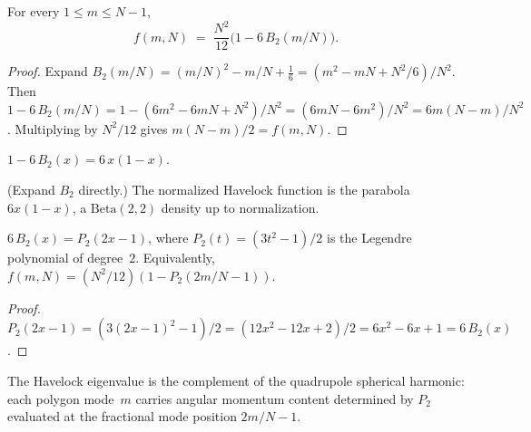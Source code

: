 \begin{theorem}
\label{thm:bernoulli-havelock}
For every $1 \le m \le N{-}1$,
\begin{equation}
  f(m,N) \;=\; \frac{N^2}{12}\bigl(1 - 6\,B_2(m/N)\bigr).
\end{equation}
\end{theorem}
\begin{proof}
Expand
$B_2(m/N) = (m/N)^2 - m/N + \tfrac{1}{6}
= (m^2 - mN + N^2/6)/N^2$.
Then
$1 - 6\,B_2(m/N) = 1 - (6m^2 - 6mN + N^2)/N^2
= (6mN - 6m^2)/N^2 = 6m(N{-}m)/N^2$.
Multiplying by $N^2/12$ gives $m(N{-}m)/2 = f(m,N)$.
\end{proof}

\begin{corollary}
\label{cor:parabola}
$1 - 6\,B_2(x) = 6\,x(1{-}x)$.
\end{corollary}
\noindent
(Expand $B_2$ directly.)
The normalized Havelock function is the parabola $6x(1{-}x)$,
a $\mathrm{Beta}(2,2)$ density up to normalization.

\begin{theorem}
\label{thm:legendre-quadrupole}
$6\,B_2(x) = P_2(2x{-}1)$, where $P_2(t) = (3t^2{-}1)/2$
is the Legendre polynomial of degree~$2$.
Equivalently, $f(m,N) = (N^2/12)(1 - P_2(2m/N{-}1))$.
\end{theorem}
\begin{proof}
$P_2(2x{-}1) = (3(2x{-}1)^2{-}1)/2 = (12x^2{-}12x{+}2)/2
= 6x^2 - 6x + 1 = 6\,B_2(x)$.
\end{proof}
\noindent
The Havelock eigenvalue is the complement of the
quadrupole spherical harmonic: each polygon mode~$m$
carries angular momentum content determined by
$P_2$ evaluated at the fractional mode position $2m/N{-}1$.

